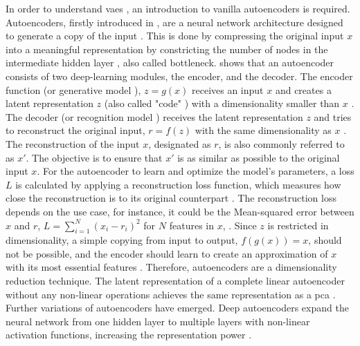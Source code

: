 In order to understand \glspl{vae} \cite{kingma2013AutoEncodingVariationalBayes}, an introduction to vanilla autoencoders is required.
Autoencoders, firstly introduced in \cite{rumelhart1986LearningInternalRepresentations}, are a neural network architecture designed to generate a copy of the input \cite{Goodfellow-et-al-2016, Bank2020Autoencoders}.
This is done by compressing the original input $x$ into a meaningful representation by constricting the number of nodes in the intermediate hidden layer \cite{aggarwal2018NeuralNetworksDeep, Bank2020Autoencoders}, also called bottleneck.
 shows that an autoencoder consists of two deep-learning modules, the encoder, and the decoder.
The encoder function (or generative \gls{model} \cite{kingma2019IntroductionVariationalAutoencoders}), $z=g(x)$ receives an input $x$ and creates a latent representation $z$ (also called "code" \cite{aggarwal2018NeuralNetworksDeep}) with a dimensionality smaller than $x$ \cite{Goodfellow-et-al-2016, Bank2020Autoencoders}.
The decoder (or recognition \gls{model} \cite{kingma2019IntroductionVariationalAutoencoders}) receives the latent representation $z$ and tries to reconstruct the original input, $r=f(z)$ with the same dimensionality as $x$ \cite{Goodfellow-et-al-2016}.
The reconstruction of the input $x$, designated as $r$, is also commonly referred to as $x'$. 
The objective is to ensure that $x'$ is as similar as possible to the original input $x$.
For the autoencoder to learn and optimize the \gls{model}'s parameters, a loss $L$ is calculated by applying a reconstruction loss function, which measures how close the reconstruction is to its original counterpart \cite{Bank2020Autoencoders, maheshwari2022AutoencoderIssuesChallenges}.
The reconstruction loss depends on the use case, for instance, it could be the Mean-squared error between $x$ and $r$, $L=\sum_{i=1}^{N}(x_i-r_i)^2$ for $N$ features in $x$, \cite{aggarwal2018NeuralNetworksDeep, Goodfellow-et-al-2016}.
Since $z$ is restricted in dimensionality, a simple copying from input to output, \ie $f(g(x))=x$, should not be possible, and the encoder should learn to create an approximation of $x$ with its most essential features \cite{aggarwal2018NeuralNetworksDeep}.
Therefore, autoencoders are a dimensionality reduction technique.
The latent representation of a complete linear autoencoder without any non-linear operations achieves the same representation as a \gls{pca} \cite{plaut2018PrincipalSubspacesPrincipal, Bank2020Autoencoders}.
Further variations of autoencoders have emerged.
Deep autoencoders expand the neural network from one hidden layer to multiple layers with non-linear activation functions, increasing the representation power \cite{aggarwal2018NeuralNetworksDeep}.
